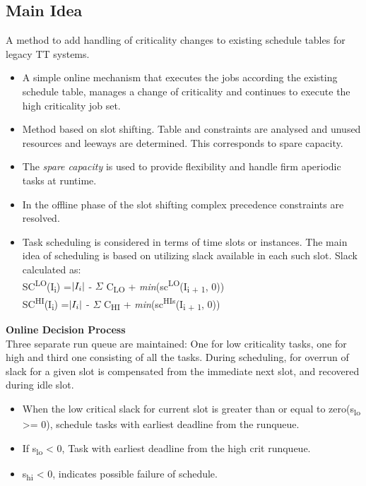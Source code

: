 \subsection*{Main Idea}
A method to add handling of criticality changes to existing schedule tables for legacy TT systems.
\begin{itemize}
	\item A simple online mechanism that executes the jobs according the existing schedule table, manages a change of criticality and continues to execute the high criticality job set.
	\item Method based on slot shifting. Table and constraints are analysed and unused resources and leeways are determined. This corresponds to spare capacity.
	\item The \textit{spare capacity} is used to provide flexibility and handle firm aperiodic tasks at runtime.
	\item In the offline phase of the slot shifting complex precedence constraints are resolved.
	\item Task scheduling is considered in terms of time slots or instances. The main idea of scheduling is based on utilizing slack available in each such slot.
	Slack calculated as:\\
		SC\textsuperscript{LO}(I\textsubscript{i}) =$\arrowvert I_i \arrowvert$ - $\Sigma$ C\textsubscript{LO} + \textit{min}(sc\textsuperscript{LO}(I\textsubscript{i + 1}, 0)) \\
		SC\textsuperscript{HI}(I\textsubscript{i}) =$\arrowvert I_i \arrowvert$ - $\Sigma$ C\textsubscript{HI} + \textit{min}(sc\textsuperscript{HIs}(I\textsubscript{i + 1}, 0))
\end{itemize}
\textbf{Online Decision Process}\\
Three separate run queue are maintained: One for low criticality tasks, one for high and third one consisting of all the tasks.
During scheduling, for overrun of slack for a given slot is compensated from the immediate next slot, and recovered during idle slot.
\begin{itemize}
	\item When the low critical slack for current slot is greater than or equal to zero(s\textsubscript{lo} >= 0), schedule tasks with earliest deadline from the runqueue.
	\item If s\textsubscript{lo} < 0, Task with earliest deadline from the high crit runqueue.
	\item s\textsubscript{hi} < 0, indicates possible failure of schedule.
\end{itemize}



